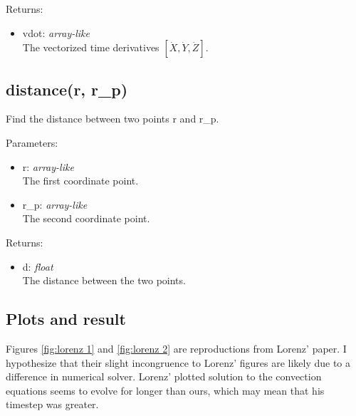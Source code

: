 \documentclass{article}
\begin{document}
Returns:
\begin{itemize}
    \item vdot: \textit{array-like} \\
    The vectorized time derivatives $[\dot X, \dot Y, \dot Z]$.
\end{itemize}
\subsection{distance(r, r\_p)}
Find the distance between two points r and r\_p.

Parameters:
\begin{itemize}
    \item r: \textit{array-like} \\
    The first coordinate point.
    \item r\_p: \textit{array-like} \\
    The second coordinate point.
\end{itemize}

Returns:
\begin{itemize}
    \item d: \textit{float} \\
    The distance between the two points.
\end{itemize}
\subsection{Plots and result}
Figures \ref{fig:lorenz 1} and \ref{fig:lorenz 2} are reproductions from Lorenz' paper. I hypothesize that their slight incongruence to Lorenz' figures are likely due to a difference in numerical solver. Lorenz' plotted solution to the convection equations seems to evolve for longer than ours, which may mean that his timestep was greater.
\end{document}
